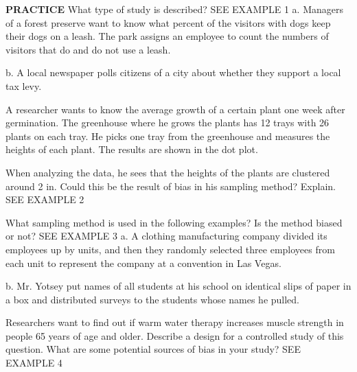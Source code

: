 \documentclass{article}
\newenvironment{practice}[2]{}{}        %
\newcommand{\answer}[1]{}               %
\newcommand{\placeholder}[2]{}          %
\begin{document}
\begin{practice}{11}{1}
\textbf{PRACTICE} What type of study is described? SEE EXAMPLE 1
a. Managers of a forest preserve want to know what percent of the visitors with dogs keep their dogs on a leash. The park assigns an employee to count the numbers of visitors that do and do not use a leash.
\answer{a. observational}
b. A local newspaper polls citizens of a city about whether they support a local tax levy.
\answer{b. sample survey}
\end{practice}
\begin{practice}{12}{2}
A researcher wants to know the average growth of a certain plant one week after germination. The greenhouse where he grows the plants has 12 trays with 26 plants on each tray. He picks one tray from the greenhouse and measures the heights of each plant. The results are shown in the dot plot.
\placeholder{graph}{Dot plot titled Plant Height. Horizontal axis Height (in.), labeled 1.5 through 4.5 in increments of 0.5; vertical label Frequency, no numerical frequency ticks. Red dots have height:frequency pairs 1.9:1, 2.0:6, 2.1:3, 2.2:3, 2.4:2, 2.5:1, 2.8:1, 3.0:1, 3.2:2, 3.3:1, 3.4:1, 3.5:1, 3.7:1, 4.0:1, 4.2:1. Total 26 dots; no arrows.}
When analyzing the data, he sees that the heights of the plants are clustered around 2 in. Could this be the result of bias in his sampling method? Explain. SEE EXAMPLE 2
\answer{Yes; he sampled plants from only one tray, so the sample is not random.}
\end{practice}
\begin{practice}{13}{2}
What sampling method is used in the following examples? Is the method biased or not? SEE EXAMPLE 3
a. A clothing manufacturing company divided its employees up by units, and then they randomly selected three employees from each unit to represent the company at a convention in Las Vegas.
\answer{a. This is a stratified random sample. It is unbiased as long as the samples chosen within each unit are chosen randomly.}
b. Mr. Yotsey put names of all students at his school on identical slips of paper in a box and distributed surveys to the students whose names he pulled.
\answer{b. This is a simple random sample. It is unbiased as long as the slips of paper were selected at random.}
\end{practice}
\begin{practice}{14}{3}
Researchers want to find out if warm water therapy increases muscle strength in people 65 years of age and older. Describe a design for a controlled study of this question. What are some potential sources of bias in your study? SEE EXAMPLE 4
\answer{Randomly assign people age 65 and older to either the control group or the experimental group. The experimental group will participate in warm water therapy and the control group will not. Bias may result because the control group could be aware that they are not receiving a treatment. There is no placebo for warm water therapy.}
\end{practice}
\end{document}
